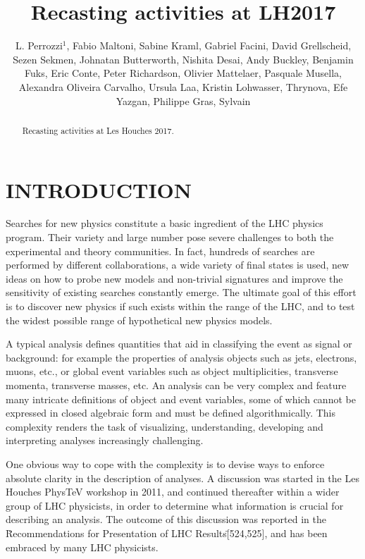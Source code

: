 \documentclass[11pt]{cernrep}
\begin{document}
\setlength\parindent{0pt}

\title{Recasting activities at LH2017}

\author{L. Perrozzi$^1$, Fabio Maltoni, Sabine Kraml, Gabriel Facini, David Grellscheid, Sezen Sekmen, Johnatan Butterworth, Nishita Desai, Andy Buckley, Benjamin Fuks, Eric Conte, Peter Richardson, Olivier Mattelaer, Pasquale Musella, Alexandra Oliveira Carvalho, Ursula Laa, Kristin Lohwasser, Thrynova, Efe Yazgan, Philippe Gras, Sylvain}

\maketitle

\begin{abstract}
Recasting activities at Les Houches 2017.
\end{abstract}

\section{INTRODUCTION}

Searches for new physics constitute a basic ingredient of the LHC physics program.
Their variety and large number pose severe challenges to both the experimental and theory communities.
In fact, hundreds of searches are performed by different collaborations, a wide variety of final states is used, 
new ideas on how to probe new models and non-trivial signatures and improve the sensitivity of existing searches constantly emerge. 
The ultimate goal of this effort is to discover new physics if such
exists within the range of the LHC, and to test the widest possible range of hypothetical new physics models.

A typical analysis defines quantities that aid in classifying the event as signal or background: for example
the properties of analysis objects such as jets, electrons, muons, etc., or global event variables
such as object multiplicities, transverse momenta, transverse masses, etc.
An analysis can be very complex and feature many intricate definitions of object and event
variables, some of which cannot be expressed in closed algebraic form and must be defined
algorithmically. This complexity renders the task of visualizing, understanding, developing and
interpreting analyses increasingly challenging.  

One obvious way to cope with the complexity is to devise ways to enforce absolute clarity in the description of analyses.
A discussion was started in the Les Houches PhysTeV workshop in 2011, and continued
thereafter within a wider group of LHC physicists, in order to determine what information is
crucial for describing an analysis. The outcome of this discussion was reported in the 
\"Recommendations for Presentation of LHC Results\" [524,525], and has been embraced by many LHC physicists.
\end{document}
